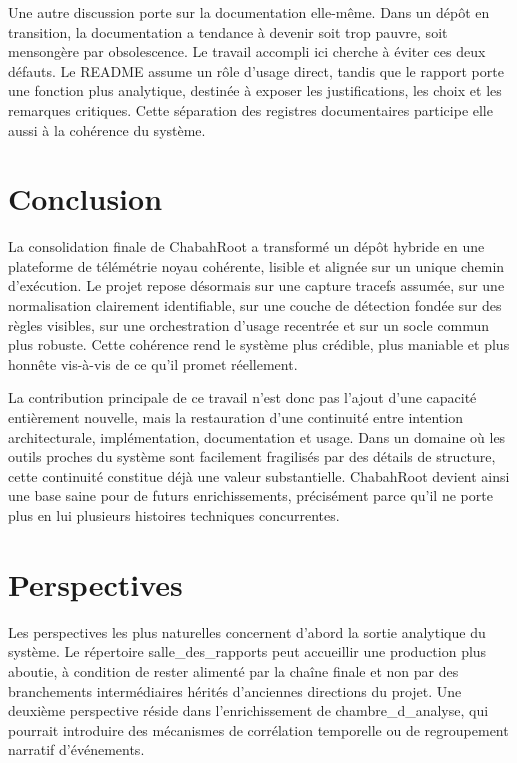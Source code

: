 \documentclass[12pt,a4paper]{report}
\begin{document}
Une autre discussion porte sur la documentation elle-même. Dans un dépôt en transition, la documentation a tendance à devenir soit trop pauvre, soit mensongère par obsolescence. Le travail accompli ici cherche à éviter ces deux défauts. Le README assume un rôle d’usage direct, tandis que le rapport porte une fonction plus analytique, destinée à exposer les justifications, les choix et les remarques critiques. Cette séparation des registres documentaires participe elle aussi à la cohérence du système.

\chapter*{Conclusion}
La consolidation finale de ChabahRoot a transformé un dépôt hybride en une plateforme de télémétrie noyau cohérente, lisible et alignée sur un unique chemin d’exécution. Le projet repose désormais sur une capture tracefs assumée, sur une normalisation clairement identifiable, sur une couche de détection fondée sur des règles visibles, sur une orchestration d’usage recentrée et sur un socle commun plus robuste. Cette cohérence rend le système plus crédible, plus maniable et plus honnête vis-à-vis de ce qu’il promet réellement.

La contribution principale de ce travail n’est donc pas l’ajout d’une capacité entièrement nouvelle, mais la restauration d’une continuité entre intention architecturale, implémentation, documentation et usage. Dans un domaine où les outils proches du système sont facilement fragilisés par des détails de structure, cette continuité constitue déjà une valeur substantielle. ChabahRoot devient ainsi une base saine pour de futurs enrichissements, précisément parce qu’il ne porte plus en lui plusieurs histoires techniques concurrentes.

\chapter*{Perspectives}
Les perspectives les plus naturelles concernent d’abord la sortie analytique du système. Le répertoire salle\_des\_rapports peut accueillir une production plus aboutie, à condition de rester alimenté par la chaîne finale et non par des branchements intermédiaires hérités d’anciennes directions du projet. Une deuxième perspective réside dans l’enrichissement de chambre\_d\_analyse, qui pourrait introduire des mécanismes de corrélation temporelle ou de regroupement narratif d’événements.
\end{document}
